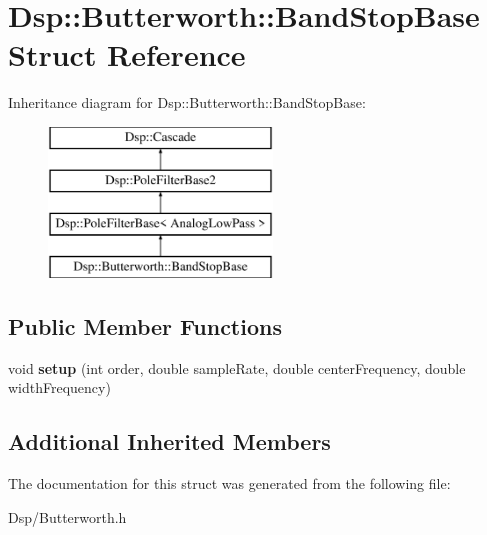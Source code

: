 \hypertarget{structDsp_1_1Butterworth_1_1BandStopBase}{\section{Dsp\-:\-:Butterworth\-:\-:Band\-Stop\-Base Struct Reference}
\label{structDsp_1_1Butterworth_1_1BandStopBase}
}
Inheritance diagram for Dsp\-:\-:Butterworth\-:\-:Band\-Stop\-Base\-:\begin{figure}[H]
\begin{center}
\leavevmode
\includegraphics[height=4.000000cm]{structDsp_1_1Butterworth_1_1BandStopBase}
\end{center}
\end{figure}
\subsection*{Public Member Functions}
\begin{DoxyCompactItemize}
\item 
\hypertarget{structDsp_1_1Butterworth_1_1BandStopBase_ab7d34c5bd9125ba48bbd1772285ceccb}{void {\bfseries setup} (int order, double sample\-Rate, double center\-Frequency, double width\-Frequency)}\label{structDsp_1_1Butterworth_1_1BandStopBase_ab7d34c5bd9125ba48bbd1772285ceccb}

\end{DoxyCompactItemize}
\subsection*{Additional Inherited Members}


The documentation for this struct was generated from the following file\-:\begin{DoxyCompactItemize}
\item 
Dsp/Butterworth.\-h\end{DoxyCompactItemize}
